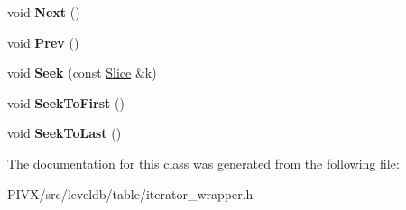 \begin{DoxyCompactItemize}
\item 
\mbox{\label{classleveldb_1_1_iterator_wrapper_abcd48a4cbd0466c8566f2c12ad8a1038}} 
void {\bfseries Next} ()
\item 
\mbox{\label{classleveldb_1_1_iterator_wrapper_abfd17dc9aef7f4d59603b2edab2ffb77}} 
void {\bfseries Prev} ()
\item 
\mbox{\label{classleveldb_1_1_iterator_wrapper_a5dc3cd4e168e8ec0ab3a094cf36ae5d0}} 
void {\bfseries Seek} (const \mbox{\hyperlink{classleveldb_1_1_slice}{Slice}} \&k)
\item 
\mbox{\label{classleveldb_1_1_iterator_wrapper_a06923cd8c121cf7491cc2b043a479445}} 
void {\bfseries Seek\+To\+First} ()
\item 
\mbox{\label{classleveldb_1_1_iterator_wrapper_ae09179113b28aa3ea1da70b3a7a5f04b}} 
void {\bfseries Seek\+To\+Last} ()
\end{DoxyCompactItemize}


The documentation for this class was generated from the following file\+:\begin{DoxyCompactItemize}
\item 
P\+I\+V\+X/src/leveldb/table/iterator\+\_\+wrapper.\+h\end{DoxyCompactItemize}
